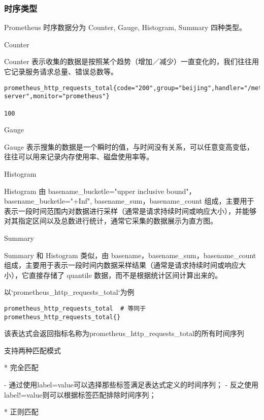 \subsubsection{时序类型}

Prometheus 时序数据分为 Counter, Gauge, Histogram, Summary 四种类型。

Counter

Counter 表示收集的数据是按照某个趋势（增加／减少）一直变化的，我们往往用它记录服务请求总量、错误总数等。

\begin{lstlisting}[language=shell]
prometheus_http_requests_total{code="200",group="beijing",handler="/metrics",instance="127.0.0.1:9090",job="prometheus-server",monitor="prometheus"}

100
\end{lstlisting}

Gauge

Gauge 表示搜集的数据是一个瞬时的值，与时间没有关系，可以任意变高变低，往往可以用来记录内存使用率、磁盘使用率等。

Histogram

Histogram 由 \<basename\>_bucket{le="\<upper inclusive bound\>"}，\<basename\>_bucket{le="+Inf"}, \<basename\>_sum，\<basename\>_count 组成，主要用于表示一段时间范围内对数据进行采样（通常是请求持续时间或响应大小），并能够对其指定区间以及总数进行统计，通常它采集的数据展示为直方图。


Summary

Summary 和 Histogram 类似，由 \<basename，\<basename\>_sum，\<basename\>_count 组成，主要用于表示一段时间内数据采样结果（通常是请求持续时间或响应大小），它直接存储了 quantile 数据，而不是根据统计区间计算出来的。




以`prometheus_http_requests_total`为例

\begin{lstlisting}[language=shell]
    prometheus_http_requests_total  # 等同于prometheus_http_requests_total{}
\end{lstlisting}

该表达式会返回指标名称为prometheus_http_requests_total的所有时间序列


支持两种匹配模式

* 完全匹配

    - 通过使用label=value可以选择那些标签满足表达式定义的时间序列；
    - 反之使用label!=value则可以根据标签匹配排除时间序列；


* 正则匹配

